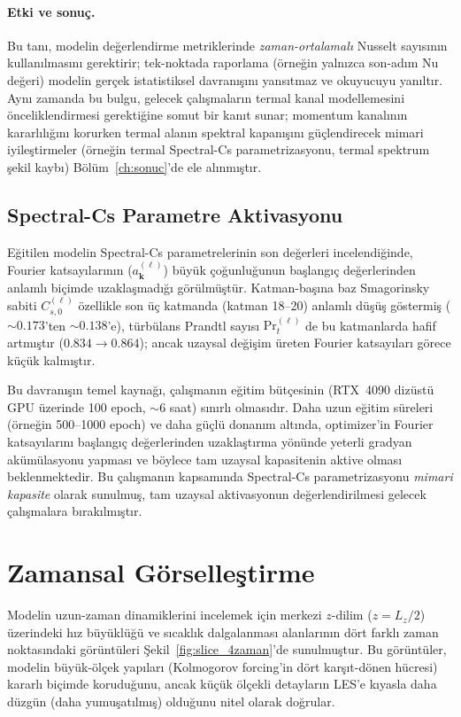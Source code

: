 \paragraph{Etki ve sonuç.} Bu tanı, modelin değerlendirme metriklerinde \emph{zaman-ortalamalı} Nusselt sayısının kullanılmasını gerektirir; tek-noktada raporlama (örneğin yalnızca son-adım Nu değeri) modelin gerçek istatistiksel davranışını yansıtmaz ve okuyucuyu yanıltır. Aynı zamanda bu bulgu, gelecek çalışmaların termal kanal modellemesini önceliklendirmesi gerektiğine somut bir kanıt sunar; momentum kanalının kararlılığını korurken termal alanın spektral kapanışını güçlendirecek mimari iyileştirmeler (örneğin termal Spectral-Cs parametrizasyonu, termal spektrum şekil kaybı) Bölüm~\ref{ch:sonuc}'de ele alınmıştır.

\subsection{Spectral-Cs Parametre Aktivasyonu}
\label{sec:spectral_cs_aktivasyon}

Eğitilen modelin Spectral-Cs parametrelerinin son değerleri incelendiğinde, Fourier katsayılarının ($a^{(\ell)}_{\mathbf{k}}$) büyük çoğunluğunun başlangıç değerlerinden anlamlı biçimde uzaklaşmadığı görülmüştür. Katman-başına baz Smagorinsky sabiti $C_{s,0}^{(\ell)}$ özellikle son üç katmanda (katman 18--20) anlamlı düşüş göstermiş ($\sim 0.173$'ten $\sim 0.138$'e), türbülans Prandtl sayısı $\mathrm{Pr}_{t}^{(\ell)}$ de bu katmanlarda hafif artmıştır ($0.834 \to 0.864$); ancak uzaysal değişim üreten Fourier katsayıları görece küçük kalmıştır.

Bu davranışın temel kaynağı, çalışmanın eğitim bütçesinin (RTX~4090 dizüstü GPU üzerinde 100 epoch, $\sim 6$ saat) sınırlı olmasıdır. Daha uzun eğitim süreleri (örneğin 500--1000 epoch) ve daha güçlü donanım altında, optimizer'in Fourier katsayılarını başlangıç değerlerinden uzaklaştırma yönünde yeterli gradyan akümülasyonu yapması ve böylece tam uzaysal kapasitenin aktive olması beklenmektedir. Bu çalışmanın kapsamında Spectral-Cs parametrizasyonu \emph{mimari kapasite} olarak sunulmuş, tam uzaysal aktivasyonun değerlendirilmesi gelecek çalışmalara bırakılmıştır.

\section{Zamansal Görselleştirme}
\label{sec:zamansal}

Modelin uzun-zaman dinamiklerini incelemek için merkezi $z$-dilim ($z=L_{z}/2$) üzerindeki hız büyüklüğü ve sıcaklık dalgalanması alanlarının dört farklı zaman noktasındaki görüntüleri Şekil~\ref{fig:slice_4zaman}'de sunulmuştur. Bu görüntüler, modelin büyük-ölçek yapıları (Kolmogorov forcing'in dört karşıt-dönen hücresi) kararlı biçimde koruduğunu, ancak küçük ölçekli detayların LES'e kıyasla daha düzgün (daha yumuşatılmış) olduğunu nitel olarak doğrular.

